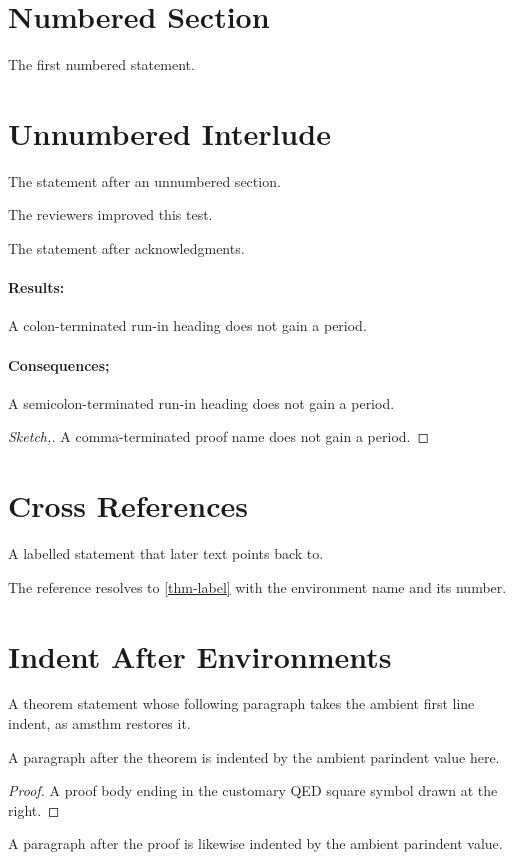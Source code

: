 \documentclass[acmsmall,nonacm]{acmart}
\begin{document}
\thispagestyle{empty}
\section{Numbered Section}
\begin{theorem}
The first numbered statement.
\end{theorem}

\section*{Unnumbered Interlude}
\begin{theorem}
The statement after an unnumbered section.
\end{theorem}

\begin{acks}
The reviewers improved this test.
\end{acks}
\begin{theorem}
The statement after acknowledgments.
\end{theorem}

\paragraph{Results:} A colon-terminated run-in heading does not gain a period.
\paragraph{Consequences;} A semicolon-terminated run-in heading does not gain a period.
\begin{proof}[Sketch,]
A comma-terminated proof name does not gain a period.
\end{proof}

\section{Cross References}
\begin{theorem}\label{thm-label}A labelled statement that later text points back to.\end{theorem}
The reference resolves to \autoref{thm-label} with the environment name and its number.

\section{Indent After Environments}
\begin{theorem}
A theorem statement whose following paragraph takes the ambient first line indent, as amsthm restores it.
\end{theorem}
A paragraph after the theorem is indented by the ambient parindent value here.

\begin{proof}
A proof body ending in the customary QED square symbol drawn at the right.
\end{proof}
A paragraph after the proof is likewise indented by the ambient parindent value.
\end{document}
